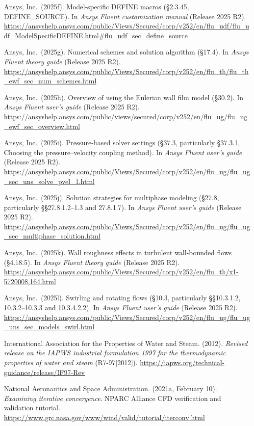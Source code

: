 \documentclass[12pt]{article}
\begin{document}
Ansys, Inc.~(2025f). Model-specific DEFINE macros (§2.3.45, DEFINE\_SOURCE). In \emph{Ansys Fluent customization manual} (Release 2025 R2). \url{https://ansyshelp.ansys.com/public/Views/Secured/corp/v252/en/flu_udf/flu_udf_ModelSpecificDEFINE.html\#flu_udf_sec_define_source}

Ansys, Inc.~(2025g). Numerical schemes and solution algorithm (§17.4). In \emph{Ansys Fluent theory guide} (Release 2025 R2). \url{https://ansyshelp.ansys.com/public/Views/Secured/corp/v252/en/flu_th/flu_th_ewf_sec_num_schemes.html}

Ansys, Inc.~(2025h). Overview of using the Eulerian wall film model (§30.2). In \emph{Ansys Fluent user's guide} (Release 2025 R2). \url{https://ansyshelp.ansys.com/public/views/secured/corp/v252/en/flu_ug/flu_ug_ewf_sec_overview.html}

Ansys, Inc.~(2025i). Pressure-based solver settings (§37.3, particularly §37.3.1, Choosing the pressure--velocity coupling method). In \emph{Ansys Fluent user's guide} (Release 2025 R2). \url{https://ansyshelp.ansys.com/public/Views/Secured/corp/v252/en/flu_ug/flu_ug_sec_uns_solve_pvel_1.html}

Ansys, Inc.~(2025j). Solution strategies for multiphase modeling (§27.8, particularly §§27.8.1.2--1.3 and 27.8.1.7). In \emph{Ansys Fluent user's guide} (Release 2025 R2). \url{https://ansyshelp.ansys.com/public/Views/Secured/corp/v252/en/flu_ug/flu_ug_sec_multiphase_solution.html}

Ansys, Inc.~(2025k). Wall roughness effects in turbulent wall-bounded flows (§4.18.5). In \emph{Ansys Fluent theory guide} (Release 2025 R2). \url{https://ansyshelp.ansys.com/public/Views/Secured/corp/v252/en/flu_th/x1-5720008.164.html}

Ansys, Inc.~(2025l). Swirling and rotating flows (§10.3, particularly §§10.3.1.2, 10.3.2--10.3.3 and 10.3.4.2.2). In \emph{Ansys Fluent user's guide} (Release 2025 R2). \url{https://ansyshelp.ansys.com/public/Views/Secured/corp/v252/en/flu_ug/flu_ug_uns_sec_models_swirl.html}

International Association for the Properties of Water and Steam. (2012). \emph{Revised release on the IAPWS industrial formulation 1997 for the thermodynamic properties of water and steam} (R7-97{[}2012{]}). \url{https://iapws.org/technical-guidance/release/IF97-Rev}

National Aeronautics and Space Administration. (2021a, February 10). \emph{Examining iterative convergence}. NPARC Alliance CFD verification and validation tutorial. \url{https://www.grc.nasa.gov/www/wind/valid/tutorial/iterconv.html}
\end{document}
